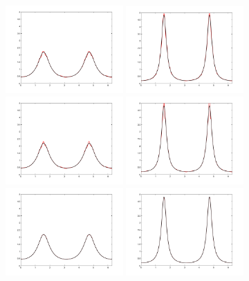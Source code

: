 \documentclass[a4paper, 12 pt]{amsart}
\begin{document}
\begin{figure}[p]
  \centering
  \includegraphics[width=0.4\textwidth]{./images/S1Wavelet_sf4nBases88scale1T1.pdf}
  \includegraphics[width=0.4\textwidth]{./images/S1Wavelet_sf4nBases88scale1T2.pdf}
  \includegraphics[width=0.4\textwidth]{./images/S1Wavelet_sf4nBases160scale2T1.pdf}
  \includegraphics[width=0.4\textwidth]{./images/S1Wavelet_sf4nBases160scale2T2.pdf}
  \includegraphics[width=0.4\textwidth]{./images/S1Wavelet_sf6nBases100scale1T1.pdf}
  \includegraphics[width=0.4\textwidth]{./images/S1Wavelet_sf6nBases100scale1T2.pdf}

\end{figure}
\end{document}
